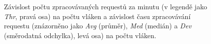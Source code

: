 \begin{figure}[h]

    \caption{Závislost počtu zpracovávaných requestů za minutu (v legendě jako \textit{Thr}, pravá osa) na počtu vláken a závislost času zpracovávání requestu (znázorněno jako \textit{Avg} (průměr), \textit{Med} (medián) a \textit{Dev} (směrodatná odchylka), levá osa) na počtu vláken.}
    \label{fig:test:exp2}
\end{figure}